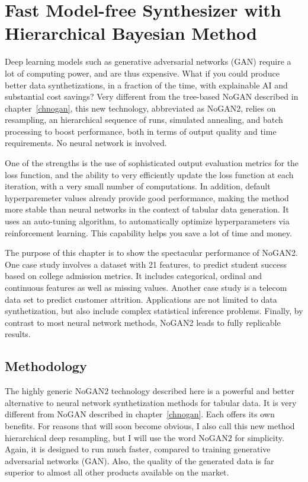 \documentclass[oneside,10pt]{book}
\begin{document}
\chapter{Fast Model-free Synthesizer with Hierarchical Bayesian Method}\label{chnogan2}

Deep learning models such as generative adversarial networks (GAN) require a lot of computing power, and are thus expensive. What if you could
 produce better data synthetizations, in a fraction of the time, with explainable AI and substantial cost savings?
 Very different from the tree-based NoGAN described in chapter~\ref{chnogan}, this new technology, abbreviated as NoGAN2, relies on resampling, an hierarchical sequence of runs, simulated annealing, and batch processing to boost
 performance, both in terms of output quality and time requirements. No neural network is involved. 

One of the strengths is the use of
 sophisticated output evaluation metrics for the loss function, and the ability to very efficiently update the loss function at each iteration, with a very small number of computations. In addition, default hyperparemeter values already provide good performance, making the method more stable
 than neural networks in the context of tabular data generation. It uses an auto-tuning algorithm,
 to automatically optimize hyperparameters via reinforcement learning. This capability helps you save a lot of time and money.

The purpose of this chapter is to show the spectacular performance of NoGAN2. One case study involves a dataset with 21 features, to predict student success based on college admission metrics. It includes categorical, ordinal and continuous features as well as missing values. Another case study is a telecom data set to predict customer attrition. Applications are not limited
 to data synthetization, but also include complex statistical inference problems. Finally, by contrast to most neural network methods, NoGAN2 leads to fully replicable results.

\section{Methodology}


 
The highly generic NoGAN2 technology described here is a powerful and better alternative to neural network synthetization methods for tabular data. It is very different from NoGAN described in chapter~\ref{chnogan}. Each offers its own benefits.
For reasons that will soon become obvious, I also call this new method \textcolor{index}{hierarchical deep resampling}, but I will use the word NoGAN2 for simplicity.
Again, it is designed to run much faster, compared to 
 training \textcolor{index}{generative adversarial networks} (GAN). Also, the quality of the generated data is far superior to almost all other products available on the market. 
\end{document}
